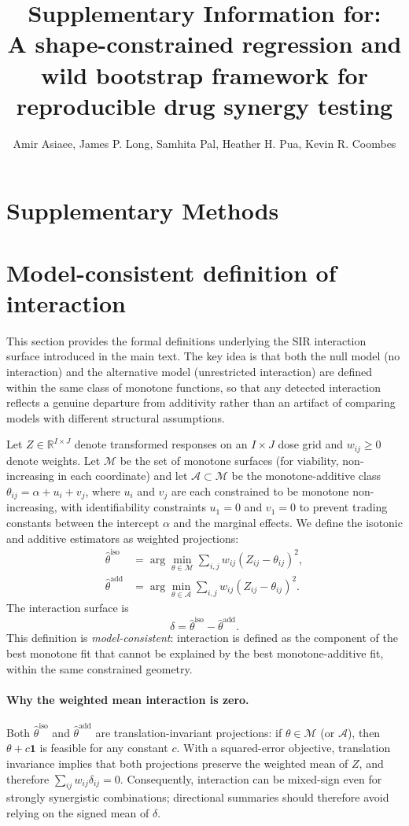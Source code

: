 \documentclass[11pt]{article}
\title{Supplementary Information for:\\ A shape-constrained regression and wild bootstrap framework for reproducible drug synergy testing}
\author{Amir Asiaee, James P. Long, Samhita Pal, Heather H. Pua, Kevin R. Coombes}
\date{}
\begin{document}
\maketitle

\section*{Supplementary Methods}

\section{Model-consistent definition of interaction}

This section provides the formal definitions underlying the SIR interaction surface introduced in the main text.
The key idea is that both the null model (no interaction) and the alternative model (unrestricted interaction) are defined within the same class of monotone functions, so that any detected interaction reflects a genuine departure from additivity rather than an artifact of comparing models with different structural assumptions.

Let $Z\in\mathbb{R}^{I\times J}$ denote transformed responses on an $I\times J$ dose grid and $w_{ij}\ge 0$ denote weights.
Let $\mathcal{M}$ be the set of monotone surfaces (for viability, non-increasing in each coordinate) and let $\mathcal{A}\subset\mathcal{M}$ be the monotone-additive class
$\theta_{ij}=\alpha+u_i+v_j$, where $u_i$ and $v_j$ are each constrained to be monotone non-increasing, with identifiability constraints $u_1=0$ and $v_1=0$ to prevent trading constants between the intercept $\alpha$ and the marginal effects.
We define the isotonic and additive estimators as weighted projections:
\begin{align}
\hat\theta^{\mathrm{iso}} &= \arg\min_{\theta\in\mathcal{M}}\sum_{i,j} w_{ij}(Z_{ij}-\theta_{ij})^2,\\
\hat\theta^{\mathrm{add}} &= \arg\min_{\theta\in\mathcal{A}}\sum_{i,j} w_{ij}(Z_{ij}-\theta_{ij})^2.
\end{align}
The interaction surface is
\begin{equation}
\delta=\hat\theta^{\mathrm{iso}}-\hat\theta^{\mathrm{add}}.
\end{equation}
This definition is \emph{model-consistent}: interaction is defined as the component of the best monotone fit that cannot be explained by the best monotone-additive fit, within the same constrained geometry.

\paragraph{Why the weighted mean interaction is zero.}
Both $\hat\theta^{\mathrm{iso}}$ and $\hat\theta^{\mathrm{add}}$ are translation-invariant projections: if $\theta\in\mathcal{M}$ (or $\mathcal{A}$), then $\theta+c\mathbf{1}$ is feasible for any constant $c$.
With a squared-error objective, translation invariance implies that both projections preserve the weighted mean of $Z$, and therefore $\sum_{ij} w_{ij}\delta_{ij}=0$.
Consequently, interaction can be mixed-sign even for strongly synergistic combinations; directional summaries should therefore avoid relying on the signed mean of $\delta$.
\end{document}
